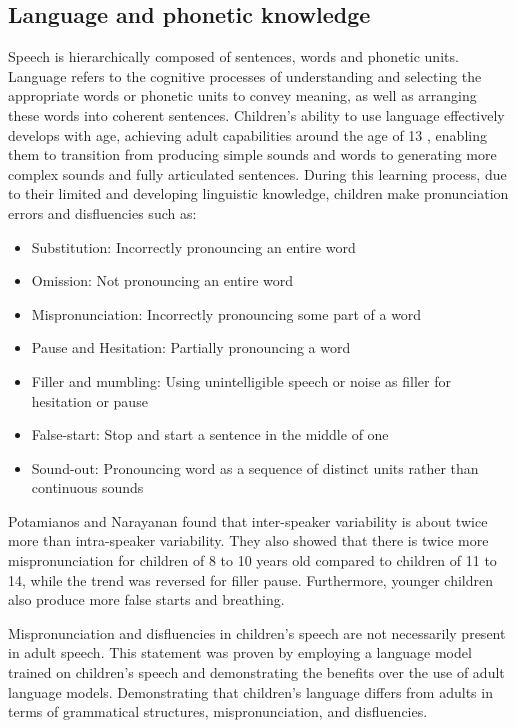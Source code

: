 \subsection{Language and phonetic knowledge} %
\label{subsection:mispron}
Speech is hierarchically composed of sentences, words and phonetic units. Language refers to the cognitive processes of understanding and selecting the appropriate words or phonetic units to convey meaning, as well as arranging these words into coherent sentences. Children's ability to use language effectively develops with age, achieving adult capabilities around the age of 13 \cite{Acoustic_change_children}, enabling them to transition from producing simple sounds and words to generating more complex sounds and fully articulated sentences.
During this learning process, due to their limited and developing linguistic knowledge, children make pronunciation errors and disfluencies \cite{language_children} such as:
\begin{itemize}
    \item Substitution: Incorrectly pronouncing an entire word 
    \item Omission: Not pronouncing an entire word
    \item Mispronunciation: Incorrectly pronouncing some part of a word
    \item Pause and Hesitation: Partially pronouncing a word
    \item Filler and mumbling: Using unintelligible speech or noise as filler for hesitation or pause 
    \item False-start: Stop and start a sentence in the middle of one
    \item Sound-out: Pronouncing word as a sequence of distinct units rather than continuous sounds
\end{itemize}
Potamianos and Narayanan \cite{language_children2} found that inter-speaker variability is about twice more than intra-speaker variability. They also showed that there is twice more mispronunciation for children of 8 to 10 years old compared to children of 11 to 14, while the trend was reversed for filler pause. Furthermore, younger children also produce more false starts and breathing.

Mispronunciation and disfluencies in children's speech are not necessarily present in adult speech. This statement was proven by \cite{Children_language_model,children_language_model2}  employing a language model trained on children's speech and demonstrating the benefits over the use of adult language models. Demonstrating that children's language differs from adults in terms of grammatical structures, mispronunciation, and disfluencies.


